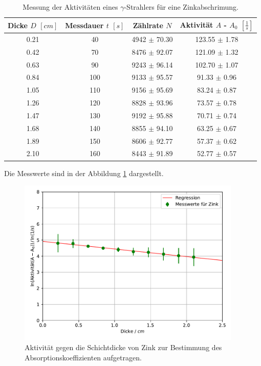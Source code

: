 \begin{table}[H]
  \begin{center}
    \caption{Messung der Aktivitäten eines $\gamma$-Strahlers für eine Zinkabschrimung.}
    \label{tab:Zink}
    \begin{tabular}{c|c|c|c} 
      \textbf{Dicke $D$ $[cm]$} & \textbf{Messdauer $t$ $[s]$} & \textbf{Zählrate $N$} & \textbf{Aktivität $A$ - $A_0$ $[\frac{1}{s}]$}\\
      \hline
        0.21 & 40 & 4942 $\pm$ 70.30 & 123.55 $\pm$ 1.78 \\
        0.42 & 70 & 8476 $\pm$ 92.07 & 121.09 $\pm$ 1.32 \\
        0.63 & 90 & 9243 $\pm$ 96.14 & 102.70 $\pm$ 1.07 \\
        0.84 & 100 & 9133 $\pm$ 95.57 & 91.33 $\pm$ 0.96 \\
        1.05 & 110 & 9156 $\pm$ 95.69 & 83.24 $\pm$ 0.87 \\
        1.26 & 120 & 8828 $\pm$ 93.96 & 73.57 $\pm$ 0.78 \\
        1.47 & 130 & 9192 $\pm$ 95.88 & 70.71 $\pm$ 0.74 \\
        1.68 & 140 & 8855 $\pm$ 94.10 & 63.25 $\pm$ 0.67 \\
        1.89 & 150 & 8606 $\pm$ 92.77 & 57.37 $\pm$ 0.62 \\
        2.10 & 160 & 8443 $\pm$ 91.89 & 52.77 $\pm$ 0.57
    \end{tabular}
  \end{center}
\end{table}

Die Messwerte sind in der Abbildung \ref{fig:zink} dargestellt.
\begin{figure}[h]
  \centering
  \includegraphics[height=8cm]{Auswertung/Zink.pdf}
  \caption{Aktivität gegen die Schichtdicke von Zink zur Bestimmung des Absorptionskoeffizienten aufgetragen.}
  \label{fig:zink}
\end{figure}

